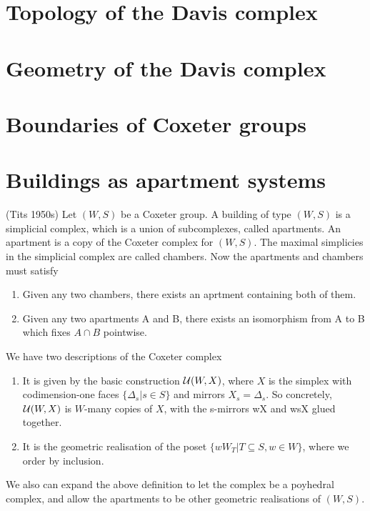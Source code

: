\documentclass[12pt]{article}
\begin{document}
\section{Topology of the Davis complex}
\section{Geometry of the Davis complex}
\section{Boundaries of Coxeter groups}


\section{Buildings as apartment systems}

\begin{definition}
    (Tits 1950s) Let $(W,S)$ be a Coxeter group. A building of type $(W,S)$ is a simplicial complex, which is a union of subcomplexes, called apartments. An apartment is a copy of the Coxeter complex for $(W,S)$. The maximal simplicies in the simplicial complex are called chambers. Now the apartments and chambers must satisfy
    \begin{enumerate}
    \item Given any two chambers, there exists an aprtment containing both of them.
    \item Given any two apartments A and B, there exists an isomorphism from A to B which fixes $A \cap B$ pointwise. 
    \end{enumerate}
\end{definition}

We have two descriptions of the Coxeter complex
\begin{enumerate}
    \item It is given by the basic construction $\mathcal{U}(W,X)$, where $X$ is the simplex with codimension-one faces $\{\Delta_s|s\in S\}$ and mirrors $X_s=\Delta_s.$ So concretely, $\mathcal{U}(W,X)$ is $W$-many copies of $X$, with the s-mirrors wX and wsX glued together. 
    \item It is the geometric realisation of the poset $\{wW_T|T\subseteq S, w\in W\}$, where we order by inclusion.
\end{enumerate}

We also can expand the above definition to let the complex be a poyhedral complex, and allow the apartments to be other geometric realisations of $(W,S)$. 
\end{document}
